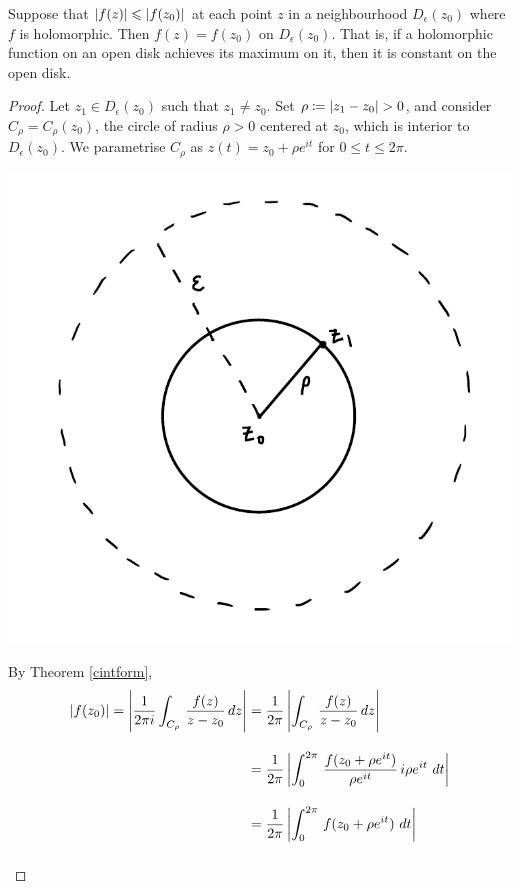 \medskip

\begin{lemma}
Suppose that $\left\lvert f(z)\right\rvert \leqslant \left\lvert f(z_0)\right\rvert$ at each point $z$ in a neighbourhood $D_\epsilon(z_0)$ where $f$ is holomorphic. Then $f(z) = f(z_0)$ on $D_\epsilon(z_0)$. That is, if a holomorphic function on an open disk achieves its maximum on it, then it is constant on the open disk.
\end{lemma}
\begin{proof}
Let $z_1 \in D_\epsilon(z_0)$ such that $z_1 \neq z_0$. Set $\rho \coloneqq \left\lvert z_1 - z_0\right\rvert > 0$, and consider $C_\rho = C_\rho(z_0)$, the circle of radius $\rho > 0$ centered at $z_0$, which is interior to $D_\epsilon(z_0)$. We parametrise $C_\rho$ as $z(t) = z_0 + \rho e^{it}$ for $0 \leq t \leq 2\pi$.
\begin{center}
\includegraphics[scale=0.55]{Sections/Illustrations/MMP.png}
\end{center}
By Theorem \ref{cintform},
\begin{align*}
\abs{f(z_0)} = \abs{\frac{1}{2\pi i}\int_{C_\rho}\,\frac{f(z)}{z - z_0}\, dz} &= \frac{1}{2\pi}\abs{\int_{C_\rho}\,\frac{f(z)}{z - z_0}\, dz}\\[1em]
 &= \frac{1}{2\pi}\abs{\int_0^{2\pi}\,\frac{f(z_0 + \rho e^{it})}{\rho e^{it}}\,i\rho e^{it}\ dt}\\[1em]
 &= \frac{1}{2\pi}\abs{\int_0^{2\pi}\,f(z_0 + \rho e^{it})\ dt}\\[1em]

\end{align*}
\end{proof}
